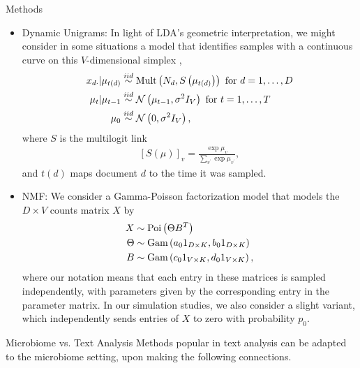 \documentclass[final]{beamer}
\newlength{\onecolwid}
\begin{document}
\begin{frame}
\begin{columns}
\begin{column}{\onecolwid}
\begin{block}{Methods}
\begin{itemize}
\item Dynamic Unigrams: In light of LDA's geometric interpretation, we
  might consider in some situations a model that identifies samples with a
  continuous curve on this $V$-dimensional simplex \citep{blei2006dynamic},
\begin{align*}
x_{d\cdot} \vert \mu_{t\left(d\right)}  &\overset{iid}{\sim} \textnormal{Mult}\left(N_{d}, S\left(\mu_{t\left(d\right)}\right)\right) \text{ for } d = 1, \dots, D\\
\mu_{t} \vert \mu_{t - 1} &\overset{iid}{\sim} \mathcal{N}\left(\mu_{t - 1}, \sigma^{2}I_{V}\right) \text{ for } t = 1, \dots, T \\
\mu_{0} &\overset{iid}{\sim} \mathcal{N}\left(0, \sigma^{2}I_{V}\right),
\end{align*}
where $S$ is the multilogit link
\begin{align*}
\left[S\left(\mu\right)\right]_{v} = \frac{\exp{\mu_{v}}}{\sum_{v^{\prime}} \exp{\mu_{v^{\prime}}}},
\end{align*}
and $t\left(d\right)$ maps document $d$ to the time it was sampled.
\item NMF: We consider a Gamma-Poisson factorization model
  \citep{zhou2015negative} that models the $D \times V$ counts matrix $X$ by
  \begin{align*}
    X &\sim \textnormal{Poi}\left(\Theta B^{T}\right) \\
    \Theta &\sim \textnormal{Gam}\left(a_{0} 1_{D \times K}, b_{0} 1_{D \times K}\right) \\
    B &\sim \textnormal{Gam}\left(c_{0} 1_{V \times K}, d_{0} 1_{V \times K} \right),
  \end{align*}
  where our notation means that each entry in these matrices is sampled
  independently, with parameters given by the corresponding entry in the parameter
  matrix. In our simulation studies, we also consider a slight variant, which
  independently sends entries of $X$ to zero with probability $p_{0}$.
\end{itemize}
\end{block}

\begin{block}{Microbiome vs. Text Analysis}
Methods popular in text analysis can be adapted to the microbiome setting, upon
making the following connections.


\end{block}
\end{column}
\end{columns}
\end{frame}
\end{document}
